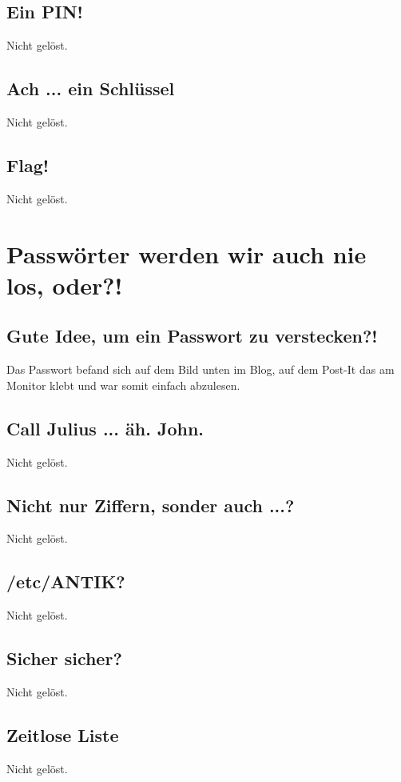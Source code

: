 \documentclass[12pt, a4paper, titlepage, oneside]{scrartcl}
\begin{document}
	\subsection{Ein PIN!}
	Nicht gelöst.

	\subsection{Ach ... ein Schl\"ussel}
	Nicht gelöst.

	\subsection{Flag!}
	Nicht gelöst.

	\section{Passwörter werden wir auch nie los, oder?!}

	\subsection{Gute Idee, um ein Passwort zu verstecken?!}
	Das Passwort befand sich auf dem Bild unten im Blog, auf dem Post-It das am Monitor klebt und war somit einfach abzulesen.

	\subsection{Call Julius ... äh. John.}
	Nicht gelöst.

	\subsection{Nicht nur Ziffern, sonder auch ...?}
	Nicht gelöst.

	\subsection{/etc/ANTIK?}
	Nicht gelöst.

	\subsection{Sicher sicher?}
	Nicht gelöst.

	\subsection{Zeitlose Liste}
	Nicht gelöst.
\end{document}
